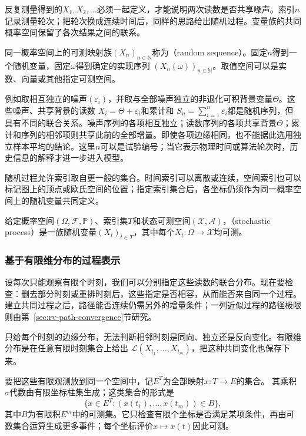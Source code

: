 反复测量得到的\(X_1,X_2,\ldots\)必须一起定义，才能说明两次读数是否共享噪声。索引\(n\)记录测量轮次；把轮次换成连续时间后，同样的思路给出随机过程。变量族的共同概率空间保留了各次结果之间的联系。
\begin{definition}[随机序列]
\label{def:rv-random-sequence}
同一概率空间上的可测映射族\((X_n)_{n\in\mathbb N}\)称为（random sequence）。固定\(n\)得到一个随机变量，固定\(\omega\)得到确定的实现序列
\((X_n(\omega))_{n\in\mathbb N}\)。取值空间可以是实数、向量或其他指定可测空间。
\end{definition}
例如取相互独立的噪声\((\varepsilon_i)\)，并取与全部噪声独立的非退化可积背景变量\(\Theta\)。这些噪声、共享背景的读数
\(X_i=\Theta+\varepsilon_i\)和累计和
\(S_n=\sum_{i=1}^n\varepsilon_i\)都是随机序列，但具有不同的联合关系。噪声序列的各项相互独立；读数序列的各项共享背景\(\Theta\)；累计和序列的相邻项则共享此前的全部增量。即使各项边缘相同，也不能据此选用独立样本平均的结论。这里\(n\)可以是试验编号；当它表示物理时间或算法轮次时，历史信息的解释才进一步进入模型。

\label{sec:rv-paths}
随机过程允许索引取自更一般的集合。时间索引可以离散或连续，空间索引也可以标记图上的顶点或欧氏空间的位置；指定索引集合后，各坐标仍须作为同一概率空间上的随机变量共同定义。
\begin{definition}[随机过程]
  \label{def:stoch-process}
  给定概率空间\((\Omega,\mathcal F,\mathbb P)\)、索引集\(T\)和状态可测空间\((\mathcal X,\mathcal A)\)，（stochastic process）是一族随机变量\((X_t)_{t\in T}\)，其中每个\(X_t:\Omega\to\mathcal X\)均可测。
\end{definition}

\subsubsection{基于有限维分布的过程表示}
\label{sec:rv-finite-dimensional-laws}
设每次只能观察有限个时刻，我们可以分别指定这些读数的联合分布。现在要检查：删去部分时刻或重排时刻后，这些指定是否相容，从而能否来自同一个过程。建立共同过程之后，路径能否连续仍需另外的增量条件；一列近似过程的路径极限则由第~\ref{sec:rv-path-convergence}节研究。

只给每个时刻的边缘分布，无法判断相邻时刻是同向、独立还是反向变化。有限维分布是在任意有限时刻集合上给出
\(\mathcal L(X_{t_1},\ldots,X_{t_m})\)，把这种共同变化也保存下来。

要把这些有限观测放到同一个空间中，记\(E^T\)为全部映射\(x:T\to E\)的集合。
其乘积\(\sigma\)代数由有限坐标柱集生成；这类集合的形式是
\[
 \{x\in E^T:(x(t_1),\ldots,x(t_m))\in B\},
\]
其中\(B\)为有限积\(E^m\)中的可测集。它只检查有限个坐标是否满足某项条件，再由可数集合运算生成更多事件；每个坐标评价\(x\mapsto x(t)\)因此可测。

